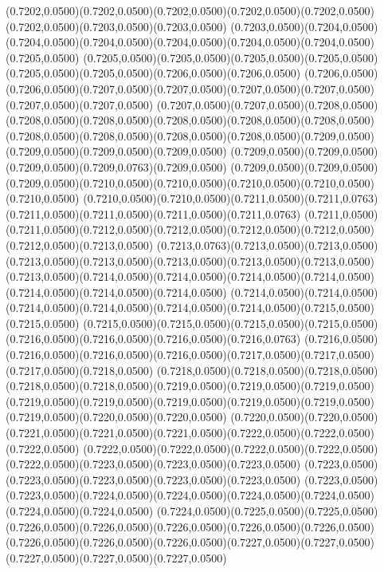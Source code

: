 (0.7202,0.0500)(0.7202,0.0500)(0.7202,0.0500)(0.7202,0.0500)(0.7202,0.0500)(0.7202,0.0500)(0.7203,0.0500)(0.7203,0.0500)
(0.7203,0.0500)(0.7204,0.0500)(0.7204,0.0500)(0.7204,0.0500)(0.7204,0.0500)(0.7204,0.0500)(0.7204,0.0500)(0.7205,0.0500)
(0.7205,0.0500)(0.7205,0.0500)(0.7205,0.0500)(0.7205,0.0500)(0.7205,0.0500)(0.7205,0.0500)(0.7206,0.0500)(0.7206,0.0500)
(0.7206,0.0500)(0.7206,0.0500)(0.7207,0.0500)(0.7207,0.0500)(0.7207,0.0500)(0.7207,0.0500)(0.7207,0.0500)(0.7207,0.0500)
(0.7207,0.0500)(0.7207,0.0500)(0.7208,0.0500)(0.7208,0.0500)(0.7208,0.0500)(0.7208,0.0500)(0.7208,0.0500)(0.7208,0.0500)
(0.7208,0.0500)(0.7208,0.0500)(0.7208,0.0500)(0.7208,0.0500)(0.7209,0.0500)(0.7209,0.0500)(0.7209,0.0500)(0.7209,0.0500)
(0.7209,0.0500)(0.7209,0.0500)(0.7209,0.0500)(0.7209,0.0763)(0.7209,0.0500)
\PST@Solid(0.7209,0.0500)(0.7209,0.0500)(0.7209,0.0500)(0.7210,0.0500)(0.7210,0.0500)(0.7210,0.0500)(0.7210,0.0500)(0.7210,0.0500)
(0.7210,0.0500)(0.7210,0.0500)(0.7211,0.0500)(0.7211,0.0763)(0.7211,0.0500)(0.7211,0.0500)(0.7211,0.0500)(0.7211,0.0763)
(0.7211,0.0500)(0.7211,0.0500)(0.7212,0.0500)(0.7212,0.0500)(0.7212,0.0500)(0.7212,0.0500)(0.7212,0.0500)(0.7213,0.0500)
(0.7213,0.0763)(0.7213,0.0500)(0.7213,0.0500)(0.7213,0.0500)(0.7213,0.0500)(0.7213,0.0500)(0.7213,0.0500)(0.7213,0.0500)
(0.7213,0.0500)(0.7214,0.0500)(0.7214,0.0500)(0.7214,0.0500)(0.7214,0.0500)(0.7214,0.0500)(0.7214,0.0500)(0.7214,0.0500)
(0.7214,0.0500)(0.7214,0.0500)(0.7214,0.0500)(0.7214,0.0500)(0.7214,0.0500)(0.7214,0.0500)(0.7215,0.0500)(0.7215,0.0500)
(0.7215,0.0500)(0.7215,0.0500)(0.7215,0.0500)(0.7215,0.0500)(0.7216,0.0500)(0.7216,0.0500)(0.7216,0.0500)(0.7216,0.0763)
(0.7216,0.0500)(0.7216,0.0500)(0.7216,0.0500)(0.7216,0.0500)(0.7217,0.0500)(0.7217,0.0500)(0.7217,0.0500)(0.7218,0.0500)
(0.7218,0.0500)(0.7218,0.0500)(0.7218,0.0500)(0.7218,0.0500)(0.7218,0.0500)(0.7219,0.0500)(0.7219,0.0500)(0.7219,0.0500)
(0.7219,0.0500)(0.7219,0.0500)(0.7219,0.0500)(0.7219,0.0500)(0.7219,0.0500)(0.7219,0.0500)(0.7220,0.0500)(0.7220,0.0500)
(0.7220,0.0500)(0.7220,0.0500)(0.7221,0.0500)(0.7221,0.0500)(0.7221,0.0500)(0.7222,0.0500)(0.7222,0.0500)(0.7222,0.0500)
(0.7222,0.0500)(0.7222,0.0500)(0.7222,0.0500)(0.7222,0.0500)(0.7222,0.0500)(0.7223,0.0500)(0.7223,0.0500)(0.7223,0.0500)
(0.7223,0.0500)(0.7223,0.0500)(0.7223,0.0500)(0.7223,0.0500)(0.7223,0.0500)
\PST@Solid(0.7223,0.0500)(0.7223,0.0500)(0.7224,0.0500)(0.7224,0.0500)(0.7224,0.0500)(0.7224,0.0500)(0.7224,0.0500)(0.7224,0.0500)
(0.7224,0.0500)(0.7225,0.0500)(0.7225,0.0500)(0.7226,0.0500)(0.7226,0.0500)(0.7226,0.0500)(0.7226,0.0500)(0.7226,0.0500)
(0.7226,0.0500)(0.7226,0.0500)(0.7226,0.0500)(0.7227,0.0500)(0.7227,0.0500)(0.7227,0.0500)(0.7227,0.0500)(0.7227,0.0500)
